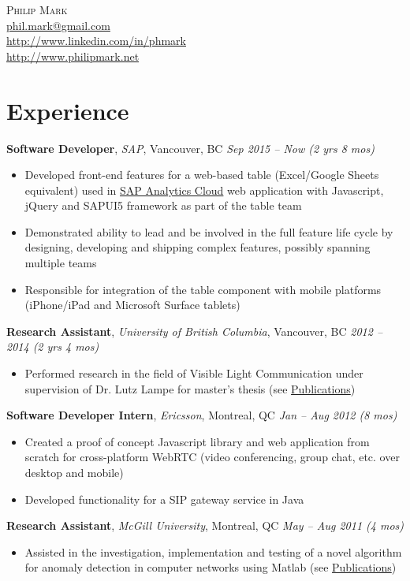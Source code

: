 \documentclass[letterpaper]{article}
\newcommand{\contact}[4]{
  \begin{center}
    {\LARGE \textsc {#1}}\\ \smallskip
    {\href{mailto:#2}{#2}}\\ \smallskip
    {\url{#3}}\\ \smallskip
    {\url{#4}}\\ \medskip
  \end{center}
}
\newcommand{\jobtitle}[4]{
  \textbf{#1}, \emph{#2}, {#3} \hfill \emph{#4}\\
}
\newenvironment{jobdescription}{
  \vspace{-4pt}
  \begin{itemize}
  \setlength{\itemsep}{2pt}
  \setlength{\parskip}{0pt}
  \setlength{\parsep}{0pt}
}{\end{itemize}}
\begin{document}

\contact{Philip Mark}{phil.mark@gmail.com}{http://www.linkedin.com/in/phmark}
{http://www.philipmark.net}

\section*{Experience}
\jobtitle{Software Developer}{SAP}{Vancouver, BC}{Sep 2015 -- Now (2 yrs 8 mos)}
\begin{jobdescription}
  \item Developed front-end features for a web-based table (Excel/Google
  Sheets equivalent) used in
  \href{https://www.sap.com/canada/products/cloud-analytics.html}{SAP Analytics 
  Cloud} web application with Javascript, jQuery and SAPUI5 framework as part
  of the table team
  \item Demonstrated ability to lead and be involved in the full feature life
  cycle by designing, developing and shipping complex features, possibly
  spanning multiple teams
  \item Responsible for integration of the table component with mobile platforms
  (iPhone/iPad and Microsoft Surface tablets)
\end{jobdescription}

\jobtitle{Research Assistant}{University of British Columbia}{Vancouver,
BC}{2012 -- 2014 (2 yrs 4 mos)}
\begin{jobdescription}
  \item Performed research in the field of Visible Light Communication under
  supervision of Dr.
  Lutz Lampe for master's thesis (see 
  \hyperlink{sec:publications}{Publications})
\end{jobdescription}

\jobtitle{Software Developer Intern}{Ericsson}{Montreal, QC}{Jan -- Aug 2012 (8
mos)}
\begin{jobdescription}
  \item Created a proof of concept Javascript library and web application from
  scratch for cross-platform WebRTC (video conferencing, group chat, etc. over
  desktop and mobile)
  \item Developed functionality for a SIP gateway service in Java
\end{jobdescription}

\jobtitle{Research Assistant}{McGill University}{Montreal, QC}{May --
Aug 2011 (4 mos)}
\begin{jobdescription}
  \item Assisted in the investigation, implementation and testing of a novel
  algorithm for anomaly detection in computer networks using Matlab (see
  \hyperlink{sec:publications}{Publications})
\end{jobdescription}
\end{document}
